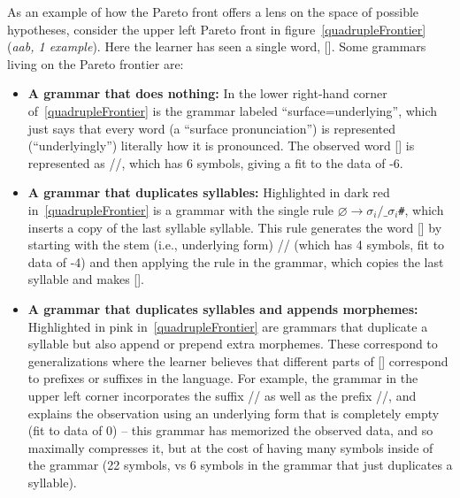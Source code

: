 \documentclass{article}
\begin{document}
As an example of how the Pareto front offers a lens on the
space of possible hypotheses,
consider the upper left Pareto front in figure~\ref{quadrupleFrontier} (\emph{aab, 1 example}).
Here the learner has seen a single word, [].
Some grammars living on the Pareto frontier are:
\begin{itemize}
\item \textbf{A grammar that does nothing:} In the lower right-hand corner of~\ref{quadrupleFrontier}
  is the grammar labeled ``surface=underlying'',
  which just says that every word (a ``surface pronunciation'')
  is represented (``underlyingly'') literally how it is pronounced.
  The observed word [] is represented as //, which has 6 symbols,
  giving a fit to the data of -6.
\item \textbf{A grammar that duplicates syllables:} Highlighted in dark red in~\ref{quadrupleFrontier}
  is a grammar with the single rule $\varnothing\to\sigma_i/\_\sigma_i$\texttt{\#},
  which inserts a copy of the last syllable syllable.
  This rule generates the word [] by starting with the stem (i.e., underlying form) // (which has 4 symbols, fit to data of -4) and then applying the rule in the grammar,
  which copies the last syllable and makes [].
\item \textbf{A grammar that duplicates syllables and appends
  morphemes:} Highlighted in pink in~\ref{quadrupleFrontier} are
  grammars that duplicate a syllable but also append or prepend extra
  morphemes.  These correspond to generalizations where the learner
  believes that different parts of [] correspond to
  prefixes or suffixes in the language.  For example, the grammar in
  the upper left corner incorporates the suffix // as well
  as the prefix //, and explains the observation using an
  underlying form that is completely empty (fit to data of 0) -- this
  grammar has memorized the observed data, and so maximally compresses
  it, but at the cost of having many symbols inside of the grammar (22 symbols, vs 6 symbols in the grammar that just duplicates a syllable).  
  \end{itemize}
\end{document}
